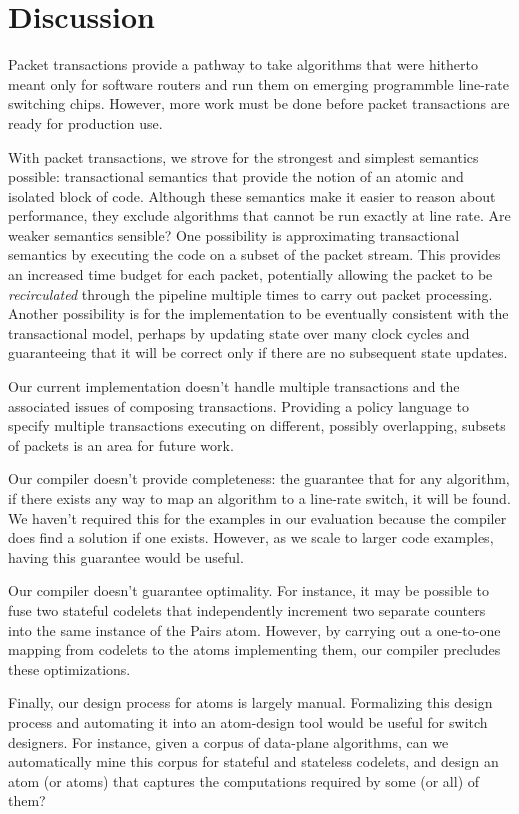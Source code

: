 \section{Discussion}
Packet transactions provide a pathway to take algorithms that were hitherto
meant only for software routers and run them on emerging programmble line-rate
switching chips. However, more work must be done before packet transactions
are ready for production use.

\begin{CompactEnumerate}
\item With packet transactions, we strove for the strongest and simplest
semantics possible: transactional semantics that provide the notion of an
atomic and isolated block of code. Although these semantics make it easier to
reason about performance, they exclude algorithms that cannot be run exactly at
line rate. Are weaker semantics sensible? One possibility is approximating
transactional semantics by executing the code on a subset of the packet stream.
This provides an increased time budget for each packet, potentially allowing
the packet to be {\em recirculated} through the pipeline multiple times to
carry out packet processing. Another possibility is for the implementation to
be eventually consistent with the transactional model, perhaps by updating
state over many clock cycles and guaranteeing that it will be correct only if
there are no subsequent state updates.
\item Our current implementation doesn't handle multiple transactions and the
associated issues of composing transactions. Providing a policy language to
specify multiple transactions executing on different, possibly overlapping,
subsets of packets is an area for future work.
\item Our compiler doesn't provide completeness: the guarantee that for any
algorithm, if there exists any way to map an algorithm to a line-rate switch,
it will be found. We haven't required this for the examples in our evaluation
because the compiler does find a solution if one exists. However, as we scale
to larger code examples, having this guarantee would be useful.
\item Our compiler doesn't guarantee optimality. For instance, it may be
possible to fuse two stateful codelets that independently increment two
separate counters into the same instance of the Pairs atom. However, by
carrying out a one-to-one mapping from codelets to the atoms implementing them,
our compiler precludes these optimizations. 
\item Finally, our design process for atoms is largely manual.  Formalizing
this design process and automating it into an atom-design tool would be useful
for switch designers. For instance, given a corpus of data-plane algorithms,
can we automatically mine this corpus for stateful and stateless codelets, and
design an atom (or atoms) that captures the computations required by some (or
all) of them?
\end{CompactEnumerate}
